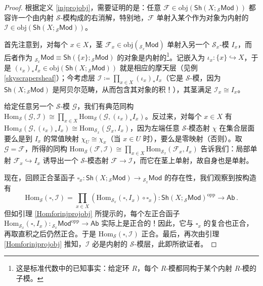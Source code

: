 \begin{proof}
根据定义 \ref{injprojobj}，需要证明的是：任意 $\mathcal{F}\in\text{obj}(\mathsf{Sh}(X;{}_\mathcal{S}\mathsf{Mod}))$ 都容许一个由内射 $\mathcal{S}$-模构成的右消解，特别地，$\mathcal{F}$ 单射入某个作为对象为内射的 $\mathcal{I}\in\text{obj}(\mathsf{Sh}(X;{}_\mathcal{S}\mathsf{Mod}))$。

首先注意到，对每个 $x\in X$，茎 $\mathcal{F}_x\in\text{obj}({}_{\mathcal{S}_x}\!\mathsf{Mod})$ 单射入另一个 $\mathcal{S}_x$-模 $I_x$，而后者作为 ${}_{\mathcal{S}_x}\!\mathsf{Mod}\equiv\mathsf{Sh}(\{x\};{}_\mathcal{S}\mathsf{Mod})$ 的对象是内射的\footnote{这是标准代数中的已知事实：给定环 $R$，每个 $R$-模都同构于某个内射 $R$-模的子模。}。记嵌入为 $\iota_x:\{x\}\hookrightarrow X$，于是 $(\iota_x)_*I_x\in\text{obj}(\mathsf{Sh}(X;{}_\mathcal{S}\mathsf{Mod}))$ 就是相应的摩天层（见例 \ref{skyscrapersheaf}）；今考虑层 $\mathcal{I}\coloneqq\prod_{x\in X}(\iota_x)_*I_x$（它是 $\mathcal{S}$-模，因为 $\mathsf{Sh}(X;{}_\mathcal{S}\mathsf{Mod})$ 是阿贝尔范畴，从而包含其对象的积！），其茎满足 $\mathcal{I}_x\cong I_x$。

给定任意另一个 $\mathcal{S}$-模 $\mathcal{G}$，我们有典范同构 $\text{Hom}_\mathcal{S}(\mathcal{G},\mathcal{I})\cong\prod_{x\in X}\text{Hom}_\mathcal{S}(\mathcal{G},(\iota_x)_*I_x)$。反过来，对每个 $x\in X$ 有 $\text{Hom}_\mathcal{S}(\mathcal{G},(\iota_x)_*I_x)\cong\text{Hom}_{\mathcal{S}_x}(\mathcal{G}_x,I_x)$，因为左端任意 $\mathcal{S}$-模态射 $\chi$ 在集合层面要么是到 $I_x$ 的常值映射 $\chi_U\cong\chi_x$（当 $x\in U$ 时），要么是零映射（否则）。取 $\mathcal{G}=\mathcal{F}$，所得的同构 $\text{Hom}_\mathcal{S}(\mathcal{F},\mathcal{I})\cong\prod_{x\in X}\text{Hom}_{\mathcal{S}_x}(\mathcal{F}_x,I_x)$ 告诉我们：局部单射 $\mathcal{F}_x\hookrightarrow I_x$ 诱导出一个 $\mathcal{S}$-模态射 $\mathcal{F}\rightarrow\mathcal{I}$，而它在茎上单射，故自身也是单射。

现在，回顾正合茎函子 $\square_x: \mathsf{Sh}(X;{}_\mathcal{S}\mathsf{Mod})\rightarrow{}_{\mathcal{S}_x}\!\mathsf{Mod}$ 的存在性，我们观察到按构造有
\[
\text{Hom}_\mathcal{S}(\square,\mathcal{I})=\prod_{x\in X}(\text{Hom}_{\mathcal{S}_x}(\square,I_x)\circ\square_x):\mathsf{Sh}(X;{}_\mathcal{S}\mathsf{Mod})^\text{opp}\rightarrow\mathsf{Ab}\,.
\] 
但如引理 \ref{Homforinjprojobj} 所提示的，每个左正合函子 $\text{Hom}_{\mathcal{S}_x}(\square,I_x):{}_{\mathcal{S}_x}\!\mathsf{Mod}^\text{opp}\rightarrow\mathsf{Ab}$ 实际上是正合的！因此，它与 $\square_x$ 的复合也正合，再取直积之后仍然正合。于是 $\text{Hom}_\mathcal{S}(\square,\mathcal{I})$ 正合。最后，再次由引理 \ref{Homforinjprojobj} 推知，$\mathcal{I}$ 必是内射的 $\mathcal{S}$-模层，此即所欲证者。
\end{proof}

